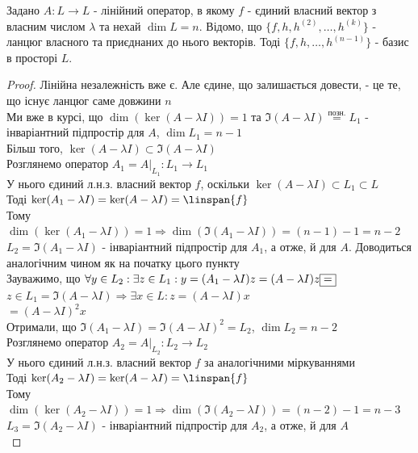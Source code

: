 \begin{theorem}
Задано $A: L \to L$ - лінійний оператор, в якому $f$ - єдиний власний вектор з власним числом $\lambda$ та нехай $\dim L = n$. Відомо, що $\{f,h,h^{(2)},\dots,h^{(k)}\}$ - ланцюг власного та приєднаних до нього векторів.
Тоді $\{f,h,\dots,h^{(n-1)}\}$ - базис в просторі $L$.
\end{theorem}

\begin{proof}
Лінійна незалежність вже є. Але єдине, що залишається довести, - це те, що існує ланцюг саме довжини $n$\\
Ми вже в курсі, що $\dim(\ker(A-\lambda I)) = 1$ та $\Im(A-\lambda I) \overset{\textrm{позн.}}{=} L_1$ - інваріантний підпростір для $A$, $\dim L_1 = n-1$\\
Більш того, $\ker(A-\lambda I) \subset \Im(A-\lambda I)$
\bigskip \\
Розглянемо оператор $A_1 = A |_{L_1}: L_1 \to L_1$\\
У нього єдиний л.н.з. власний вектор $f$, оскільки $\ker(A-\lambda I) \subset L_1 \subset L$\\
Тоді $\ker(A_1-\lambda I) = \ker(A-\lambda I) = \linspan\{f\}$\\
Тому $\dim(\ker(A_1 - \lambda I)) = 1 \Rightarrow \dim (\Im(A_1-\lambda I)) = (n-1)-1=n-2$\\
$L_2 = \Im(A_1-\lambda I)$ - інваріантний підпростір для $A_1$, а отже, й для $A$. Доводиться аналогічним чином як на початку цього пункту\\
Зауважимо, що $\forall y \in L_2: \exists z \in L_1: \\ y = (A_1 - \lambda I)z = (A-\lambda I)z \boxed{=}$\\
$z \in L_1 = \Im(A-\lambda I) \Rightarrow \exists x \in L: z = (A-\lambda I)x$\\
$\boxed{=} (A-\lambda I)^2 x$\\
Отримали, що $\Im(A_1 - \lambda I) = \Im(A-\lambda I)^2 = L_2$, $\dim L_2 = n-2$
\bigskip \\
Розглянемо оператор $A_2 = A |_{L_2}: L_2 \to L_2$\\
У нього єдиний л.н.з. власний вектор $f$ за аналогічними міркуваннями\\
Тоді $\ker(A_2-\lambda I) = \ker(A-\lambda I) = \linspan\{f\}$\\
Тому $\dim(\ker(A_2 - \lambda I)) = 1 \Rightarrow \dim (\Im(A_2-\lambda I)) = (n-2)-1=n-3$\\
$L_3 = \Im(A_2-\lambda I)$ - інваріантний підпростір для $A_2$, а отже, й для $A$\\

\end{proof}
